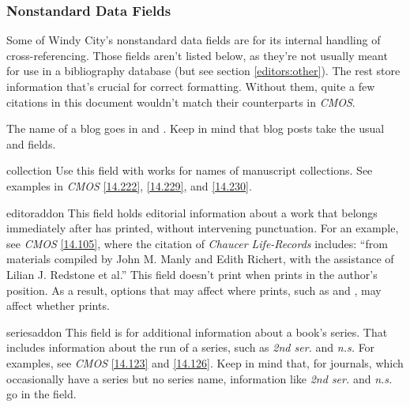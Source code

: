 \documentclass[11pt,letterpaper,oneside]{article}
\begin{document}
\subsubsection{Nonstandard Data Fields}

Some of Windy City's nonstandard data fields are for its internal
handling of cross-referencing. Those fields aren't listed below, as
they're not usually meant for use in a bibliography database (but see
section \ref{editors:other}). The rest store information that's
crucial for correct formatting. Without them, quite a few citations in
this document wouldn't match their counterparts in \textit{CMOS}.

\begin{marglist}

\item[\smash{\tshortstack[l]{blogtitle\\blogsubtitle}}] The name of a
blog goes in  and . Keep in
mind that blog posts take the usual  and
 fields.

\item[collection] Use this field with  works for
names of manuscript collections. See examples in \textit{CMOS}
\ref{14.222}, \ref{14.229}, and \ref{14.230}.

\item[editoraddon] This field holds editorial information about a work
that belongs immediately after  has printed, without
intervening punctuation. For an example, see \textit{CMOS}
\ref{14.105}, where the citation of \textit{Chaucer Life-Records}
includes: ``from materials compiled by John M. Manly and Edith
Richert, with the assistance of Lilian J. Redstone et al.'' This field
doesn't print when  prints in the author's position.
As a result, options that may affect where  prints,
such as  and , may affect whether
 prints.



\item[seriesaddon] This field is for additional information about a
book's series. That includes information about the run of a series,
such as \textit{2nd ser.} and \textit{n.s.} For examples, see
\textit{CMOS} \ref{14.123} and \ref{14.126}. Keep in mind that, for
journals, which occasionally have a series but no series name,
information like \textit{2nd ser.} and \textit{n.s.} go in the
 field.


\end{marglist}
\end{document}

